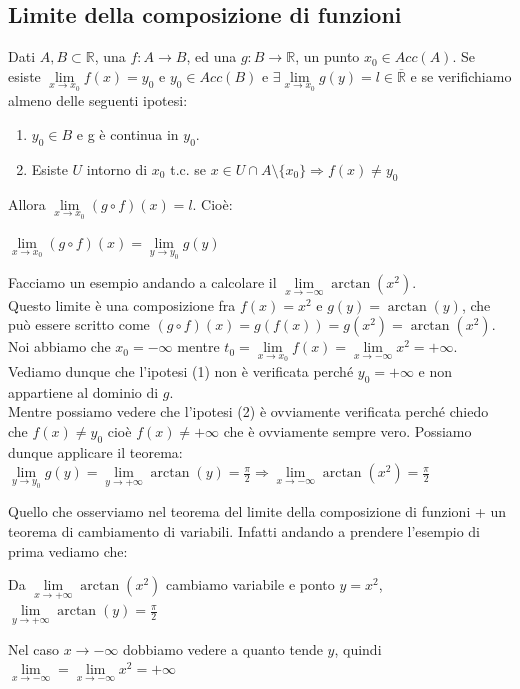 \subsection{Limite della composizione di funzioni}
\begin{theorem}
    Dati $A,B \subset \mathbb{R}$, una $f: A \to B$, ed una $g: B \to \mathbb{R}$, un punto $x_0 \in Acc(A)$. Se esiste $\lim\limits_{x\to x_0}f(x) = y_0$ e $y_0 \in Acc(B)$ e $\exists \lim\limits_{x\to x_0}g(y) = l \in \overline{\mathbb{R}}$ e se verifichiamo almeno delle seguenti ipotesi:
    \begin{enumerate}
        \item $y_0 \in B$ e g è continua in $y_0$.
        \item Esiste $U$ intorno di $x_0$ t.c. se $x \in U \cap A \setminus \{x_0\} \Longrightarrow f(x) \neq y_0$
    \end{enumerate}
    Allora $\lim\limits_{x\to x_0}(g \circ f)(x) = l$. Cioè:
    \begin{center}
        \vspace{-5pt}
        $\lim\limits_{x\to x_0}(g \circ f)(x) = \lim\limits_{y\to y_0}g(y)$
    \end{center}
\end{theorem}
\begin{example}
Facciamo un esempio andando a calcolare il $\lim\limits_{x\to -\infty}\arctan(x^2)$.\\
Questo limite è una composizione fra $f(x) = x^2$ e $g(y) = \arctan(y)$, che può essere scritto come $(g \circ f)(x) = g(f(x)) = g(x^2) = \arctan(x^2)$.\\
Noi abbiamo che $x_0 = -\infty$ mentre $t_0 = \lim\limits_{x\to x_0}f(x) = \lim\limits_{x\to -\infty}x^2 = +\infty$.\\
Vediamo dunque che l'ipotesi (1) non è verificata perché $y_0 = +\infty$ e non appartiene al dominio di $g$.\\
Mentre possiamo vedere che l'ipotesi (2) è ovviamente verificata perché chiedo che $f(x) \neq y_0$ cioè $f(x) \neq +\infty$ che è ovviamente sempre vero. Possiamo dunque applicare il teorema:\\
$\lim\limits_{y\to y_0}g(y) = \lim\limits_{y\to +\infty}\arctan(y) = \frac{\pi}{2} \Longrightarrow \lim\limits_{x\to -\infty}\arctan(x^2) = \frac{\pi}{2}$
\end{example}
\begin{observation}
    Quello che osserviamo nel teorema del limite della composizione di funzioni + un teorema di cambiamento di variabili. Infatti andando a prendere l'esempio di prima vediamo che:
    \begin{center}
        Da $\lim\limits_{x\to +\infty}\arctan(x^2)$ cambiamo variabile e ponto $y = x^2$, $\lim\limits_{y\to +\infty}\arctan(y) = \frac{\pi}{2}$
    \end{center}
    Nel caso $x\to -\infty$ dobbiamo vedere a quanto tende $y$, quindi $\lim\limits_{x\to -\infty} = \lim\limits_{x\to -\infty}x^2 = +\infty$
\end{observation}
